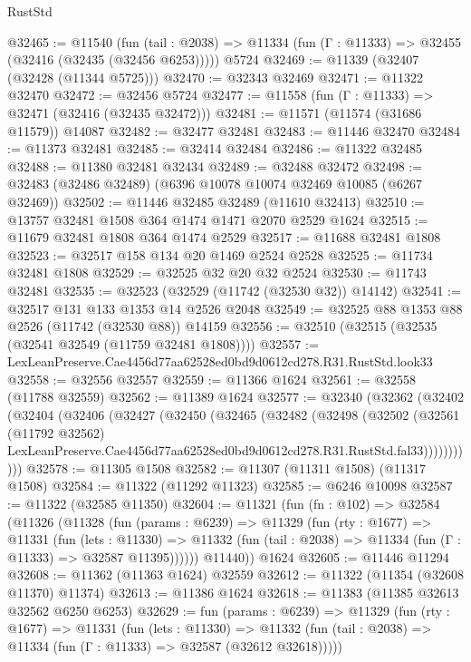 \begin{lexlean}{RustStd}
\begin{coremodule}
@32465 := @11540
    (fun (tail : @2038) => @11334 (fun (Γ : @11333) => @32455 (@32416 (@32435 (@32456 @6253)))))
    @5724
@32469 := @11339 (@32407 (@32428 (@11344 @5725)))
@32470 := @32343 @32469
@32471 := @11322 @32470
@32472 := @32456 @5724
@32477 := @11558 (fun (Γ : @11333) => @32471 (@32416 (@32435 @32472)))
@32481 := @11571 (@11574 (@31686 @11579)) @14087
@32482 := @32477 @32481
@32483 := @11446 @32470
@32484 := @11373 @32481
@32485 := @32414 @32484
@32486 := @11322 @32485
@32488 := @11380 @32481 @32434
@32489 := @32488 @32472
@32498 := @32483 (@32486 @32489) (@6396 @10078 @10074 @32469 @10085 (@6267 @32469))
@32502 := @11446 @32485 @32489 (@11610 @32413)
@32510 := @13757 @32481 @1508 @364 @1474 @1471 @2070 @2529 @1624
@32515 := @11679 @32481 @1808 @364 @1474 @2529
@32517 := @11688 @32481 @1808
@32523 := @32517 @158 @134 @20 @1469 @2524 @2528
@32525 := @11734 @32481 @1808
@32529 := @32525 @32 @20 @32 @2524
@32530 := @11743 @32481
@32535 := @32523 (@32529 (@11742 (@32530 @32)) @14142)
@32541 := @32517 @131 @133 @1353 @14 @2526 @2048
@32549 := @32525 @88 @1353 @88 @2526 (@11742 (@32530 @88)) @14159
@32556 := @32510 (@32515 (@32535 (@32541 @32549 (@11759 @32481 @1808))))
@32557 := LexLeanPreserve.Cae4456d77aa62528ed0bd9d0612cd278.R31.RustStd.look33
@32558 := @32556 @32557
@32559 := @11366 @1624
@32561 := @32558 (@11788 @32559)
@32562 := @11389 @1624
@32577 := @32340
    (@32362
      (@32402
        (@32404
          (@32406
            (@32427
              (@32450
                (@32465
                  (@32482
                    (@32498
                      (@32502
                        (@32561
                          (@11792 @32562)
                          LexLeanPreserve.Cae4456d77aa62528ed0bd9d0612cd278.R31.RustStd.fal33)))))))))))
@32578 := @11305 @1508
@32582 := @11307 (@11311 @1508) (@11317 @1508)
@32584 := @11322 (@11292 @11323)
@32585 := @6246 @10098
@32587 := @11322 (@32585 @11350)
@32604 := @11321
    (fun (fn : @102) =>
    @32584
      (@11326
        (@11328
          (fun (params : @6239) =>
          @11329
            (fun (rty : @1677) =>
            @11331
              (fun (lets : @11330) =>
              @11332 (fun (tail : @2038) => @11334 (fun (Γ : @11333) => @32587 @11395))))))
        @11440))
    @1624
@32605 := @11446 @11294
@32608 := @11362 (@11363 @1624) @32559
@32612 := @11322 (@11354 (@32608 @11370) @11374)
@32613 := @11386 @1624
@32618 := @11383 (@11385 @32613 @32562 @6250 @6253)
@32629 := fun (params : @6239) =>
  @11329
    (fun (rty : @1677) =>
    @11331
      (fun (lets : @11330) =>
      @11332 (fun (tail : @2038) => @11334 (fun (Γ : @11333) => @32587 (@32612 @32618)))))

\end{coremodule}
\end{lexlean}
